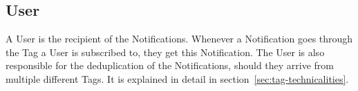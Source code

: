 \subsection{User}\label{sec:user}

A User is the recipient of the Notifications.
Whenever a Notification
goes through the Tag a User is subscribed to,
they get this Notification.
The User is also responsible for
the deduplication of the Notifications,
should they arrive from multiple different Tags.
It is explained in detail in section~\ref{sec:tag-technicalities}.
